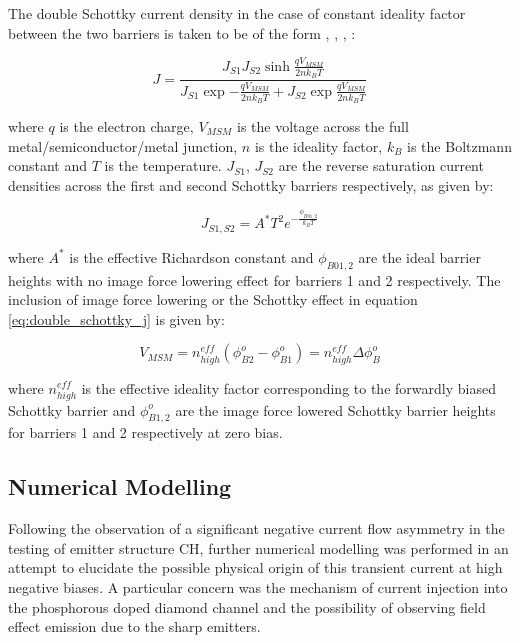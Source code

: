 \begin{refsection}
The double Schottky current density in the case of constant ideality factor between the two barriers is taken to be of the form \cite{Nouchi2014}, \cite{Tang2006}, \cite{Chiquito2012}, \cite{Molinari2008}:

\begin{equation}
    J = \frac{J_{S1}J_{S2}\sinh{\frac{qV_{MSM}}{2nk_{B}T}}}{J_{S1}\exp{-\frac{qV_{MSM}}{2nk_{B}T}} + J_{S2}\exp{\frac{qV_{MSM}}{2nk_{B}T}}}
    \label{eq:double_schottky_j}
\end{equation}

where $q$ is the electron charge, $V_{MSM}$ is the voltage across the full metal/semiconductor/metal junction, $n$ is the ideality factor, $k_{B}$ is the Boltzmann constant and $T$ is the temperature. $J_{S1}$, $J_{S2}$ are the reverse saturation current densities across the first and second Schottky barriers respectively, as given by:

\begin{equation}
    J_{S1,S2} = A^{*}T^{2}e^{-\frac{\phi_{B01,2}}{k_{B}T}}
    \label{eq:reverse_saturation_j}
\end{equation}

where $A^{*}$ is the effective Richardson constant and $\phi_{B01,2}$ are the ideal barrier heights with no image force lowering effect for barriers 1 and 2 respectively. The inclusion of image force lowering or the Schottky effect \cite{Monch2004} in equation \ref{eq:double_schottky_j} is given by:

\begin{equation}
    V_{MSM} = n_{high}^{eff}\left(\phi_{B2}^{o}-\phi_{B1}^{o}\right) = n_{high}^{eff}\Delta\phi_{B}^{o}
    \label{eq:vmsm_correction}
\end{equation}

where $n_{high}^{eff}$ is the effective ideality factor corresponding to the forwardly biased Schottky barrier and $\phi_{B1,2}^{o}$ are the image force lowered Schottky barrier heights for barriers 1 and 2 respectively at zero bias.

\subsection{Numerical Modelling}
Following the observation of a significant negative current flow asymmetry in the testing of emitter structure CH, further numerical modelling was performed in an attempt to elucidate the possible physical origin of this transient current at high negative biases. A particular concern was the mechanism of current injection into the phosphorous doped diamond channel and the possibility of observing field effect emission due to the sharp emitters.


\end{refsection}
